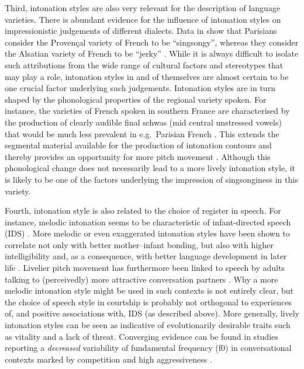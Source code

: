 Third, intonation styles are also very relevant for the description of language varieties. There is abundant evidence for the influence of intonation styles on impressionistic judgements of different dialects. Data in \citet[p. 258]{kuiperParisianPerceptionsRegional1999} show that Parisians consider the Proven\c{c}al variety of French to be ``singsongy'', whereas they consider the Alsatian variety of French to be ``jerky'' \citep[see also][]{nolanIntonation2006}. While it is always difficult to isolate such attributions from the wide range of cultural factors and stereotypes that may play a role, intonation styles in and of themselves are almost certain to be one crucial factor underlying such judgements. Intonation styles are in turn shaped by the phonological properties of the regional variety spoken. For instance, the varieties of French spoken in southern France are characterised by the production of clearly audible final schwas (mid central unstressed vowels) that would be much less prevalent in e.g.~Parisian French \citep{coquillanFrancaisMeridionalElements2010}. This extends the segmental material available for the production of intonation contours and thereby provides an opportunity for more pitch movement \citep{griceWordFinalSchwa2018,torreiraMelodicConstructionsSpanish2018}. Although this phonological change does not necessarily lead to a more lively intonation style, it is likely to be one of the factors underlying the impression of singsonginess in this variety.

Fourth, intonation style is also related to the choice of register in speech. For instance, melodic intonation seems to be characteristic of infant-directed speech (IDS) \citep[e.g.][]{holmesIntroductionSociolinguistics2013}. More melodic or even exaggerated intonation styles have been shown to correlate not only with better mother--infant bonding, but also with higher intelligibility and, as a consequence, with better language development in later life \citep{kuhlPhoneticLearningPathway2008,liuAssociationMothersSpeech2003}. Livelier pitch movement has furthermore been linked to speech by adults talking to (perceivedly) more attractive conversation partners \citep{leongomezVocalModulationCourtship2014}. Why a more melodic intonation style might be used in such contexts is not entirely clear, but the choice of speech style in courtship is probably not orthogonal to experiences of, and positive associations with, IDS (as described above). More generally, lively intonation styles can be seen as indicative of evolutionarily desirable traits such as vitality and a lack of threat. Converging evidence can be found in studies reporting a \emph{decreased} variability of fundamental frequency (f0) in conversational contexts marked by competition and high aggressiveness \citep{hodges-simeonDifferentVocalParameters2010}.


